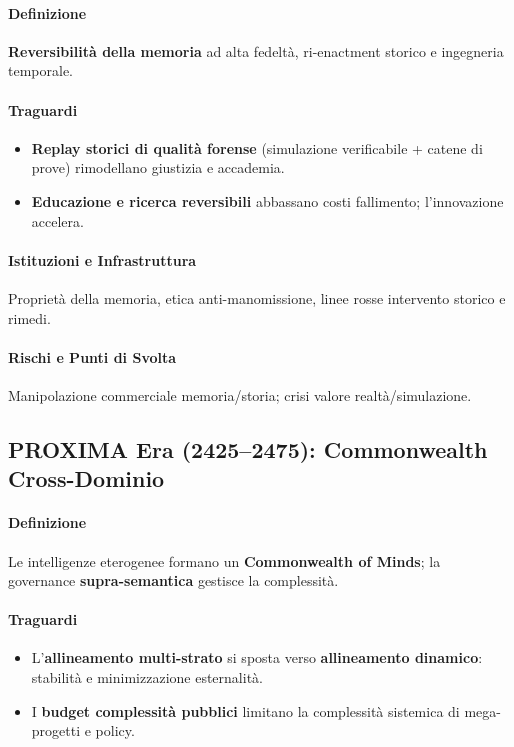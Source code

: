 \documentclass[11pt]{article}
\begin{document}
\begin{itemize}[noitemsep]
\paragraph{Definizione} \textbf{Reversibilità della memoria} ad alta fedeltà, ri-enactment storico e ingegneria temporale.

\paragraph{Traguardi}
\begin{itemize}[noitemsep]
  \item \textbf{Replay storici di qualità forense} (simulazione verificabile + catene di prove) rimodellano giustizia e accademia.
  \item \textbf{Educazione e ricerca reversibili} abbassano costi fallimento; l'innovazione accelera.
\end{itemize}

\paragraph{Istituzioni e Infrastruttura} Proprietà della memoria, etica anti-manomissione, linee rosse intervento storico e rimedi.

\paragraph{Rischi e Punti di Svolta} Manipolazione commerciale memoria/storia; crisi valore realtà/simulazione.

\subsection{PROXIMA Era (2425–2475): Commonwealth Cross-Dominio}
\paragraph{Definizione} Le intelligenze eterogenee formano un \textbf{Commonwealth of Minds}; la governance \textbf{supra-semantica} gestisce la complessità.

\paragraph{Traguardi}
\begin{itemize}[noitemsep]
  \item L'\textbf{allineamento multi-strato} si sposta verso \textbf{allineamento dinamico}: stabilità e minimizzazione esternalità.
  \item I \textbf{budget complessità pubblici} limitano la complessità sistemica di mega-progetti e policy.
\end{itemize}


\end{itemize}
\end{document}
